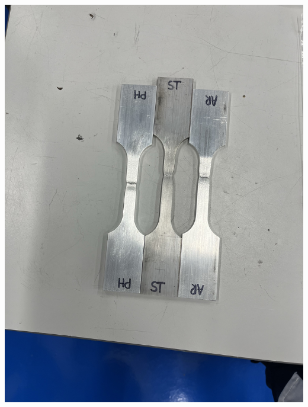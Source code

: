\documentclass{article}
\begin{document}
\begin{center}
    \begin{minipage}{0.45\textwidth}
    \centering    
    \includegraphics[width=\textwidth]{images/image(6).jpeg}
    \label{fig:broken_alloys}
\end{minipage}%
\hfil
\begin{minipage}{0.45\textwidth}
    \centering    

\end{minipage}
\end{center}
\end{document}
